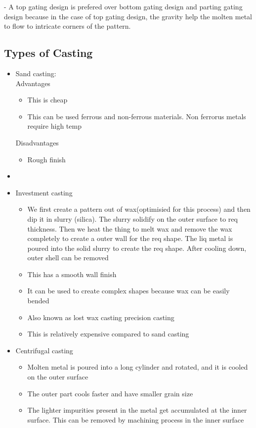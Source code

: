 \documentclass{article}
\begin{document}
- A top gating design is prefered over bottom gating design and parting gating design because in the case of top gating design, the gravity help the molten metal to flow to intricate corners of the pattern.





\subsection{Types of Casting}

\begin{itemize}
\item Sand casting:\\
	Advantages
	\begin{itemize}
		\item This is cheap
		\item This can be used ferrous and non-ferrous materials. Non ferrorus metals require high temp
	\end{itemize}

	Disadvantages
	\begin{itemize}
		\item Rough finish
	\end{itemize}
	\item

\item Investment casting
	\begin{itemize}
		\item We first create a pattern out of wax(optimisied for this process)  and then dip it in slurry (silica). The slurry solidify on the outer surface to req thickness. Then we heat the thing to melt wax and remove the wax completely to create a outer wall for the req shape. The liq metal is poured into the solid slurry to create the req shape. After cooling down, outer shell can be removed
		\item This has a smooth wall finish
		\item It can be used to create complex shapes because wax can be easily bended 
		\item Also known as lost wax casting precision casting
		\item This is relatively expensive compared to sand casting
	\end{itemize}


\item Centrifugal casting
	\begin{itemize}
	\item Molten metal is poured into a long cylinder and rotated, and it is cooled on the outer surface
	\item The outer part cools faster and have smaller grain size
	\item The lighter impurities present in the metal get accumulated at the inner surface. This can be removed by machining process in the inner surface
	\end{itemize}


\end{itemize}
\end{document}
